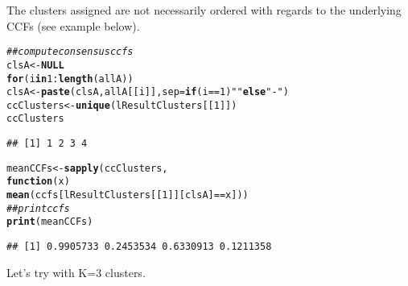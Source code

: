 \documentclass{article}\usepackage[]{graphicx}\usepackage[]{color}
\makeatletter
\newcommand{\hlnum}[1]{\textcolor[rgb]{0.686,0.059,0.569}{#1}}%
\newcommand{\hlstr}[1]{\textcolor[rgb]{0.192,0.494,0.8}{#1}}%
\newcommand{\hlcom}[1]{\textcolor[rgb]{0.678,0.584,0.686}{\textit{#1}}}%
\newcommand{\hlopt}[1]{\textcolor[rgb]{0,0,0}{#1}}%
\newcommand{\hlstd}[1]{\textcolor[rgb]{0.345,0.345,0.345}{#1}}%
\newcommand{\hlkwa}[1]{\textcolor[rgb]{0.161,0.373,0.58}{\textbf{#1}}}%
\newcommand{\hlkwb}[1]{\textcolor[rgb]{0.69,0.353,0.396}{#1}}%
\newcommand{\hlkwc}[1]{\textcolor[rgb]{0.333,0.667,0.333}{#1}}%
\newcommand{\hlkwd}[1]{\textcolor[rgb]{0.737,0.353,0.396}{\textbf{#1}}}%
\newenvironment{kframe}{%
 \def\at@end@of@kframe{}%
 \ifinner\ifhmode%
  \def\at@end@of@kframe{\end{minipage}}%
  \begin{minipage}{\columnwidth}%
 \fi\fi%
 \def\FrameCommand##1{\hskip\@totalleftmargin \hskip-\fboxsep
 \colorbox{shadecolor}{##1}\hskip-\fboxsep
     \hskip-\linewidth \hskip-\@totalleftmargin \hskip\columnwidth}%
 \MakeFramed {\advance\hsize-\width
   \@totalleftmargin\z@ \linewidth\hsize
   \@setminipage}}%
 {\par\unskip\endMakeFramed%
 \at@end@of@kframe}
\newenvironment{knitrout}{}{} %
\makeatother
\begin{document}
The clusters assigned are not necessarily ordered with regards to the
underlying CCFs (see example below).


\begin{knitrout}\scriptsize
{}\color{fgcolor}\begin{kframe}
\begin{alltt}
\hlcom{## compute consensus ccfs}
\hlstd{clsA} \hlkwb{<-} \hlkwa{NULL}
\hlkwa{for}\hlstd{(i} \hlkwa{in} \hlnum{1}\hlopt{:}\hlkwd{length}\hlstd{(allA))}
    \hlstd{clsA} \hlkwb{<-} \hlkwd{paste}\hlstd{(clsA,allA[[i]],}\hlkwc{sep}\hlstd{=}\hlkwa{if}\hlstd{(i}\hlopt{==}\hlnum{1}\hlstd{)} \hlstr{""} \hlkwa{else} \hlstr{"-"}\hlstd{)}
\hlstd{ccClusters} \hlkwb{<-} \hlkwd{unique}\hlstd{(lResultClusters[[}\hlnum{1}\hlstd{]])}
\hlstd{ccClusters}
\end{alltt}
\begin{verbatim}
## [1] 1 2 3 4
\end{verbatim}
\begin{alltt}
\hlstd{meanCCFs} \hlkwb{<-} \hlkwd{sapply}\hlstd{(ccClusters,}
                  \hlkwa{function}\hlstd{(}\hlkwc{x}\hlstd{)}
                      \hlkwd{mean}\hlstd{(ccfs[lResultClusters[[}\hlnum{1}\hlstd{]][clsA]}\hlopt{==}\hlstd{x]))}
\hlcom{## print ccfs}
\hlkwd{print}\hlstd{(meanCCFs)}
\end{alltt}
\begin{verbatim}
## [1] 0.9905733 0.2453534 0.6330913 0.1211358
\end{verbatim}
\end{kframe}
\end{knitrout}


Let's try with K=3 clusters.
\end{document}
